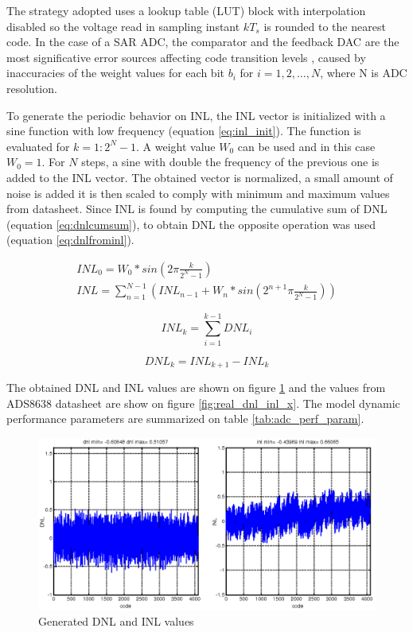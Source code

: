 \documentclass[conference]{IEEEtran}
\begin{document}
The strategy adopted uses a lookup table (LUT) block with interpolation disabled so the voltage read in sampling instant $kT_s$ is rounded to the nearest code. In the case of a SAR ADC, the comparator and the feedback DAC are the most significative error sources affecting code transition levels \cite{michaeli_unif}, caused by inaccuracies of the weight values for each bit $b_i$ for $i = 1, 2, \dots, N$, where N is ADC resolution. 

To generate the periodic behavior on INL, the INL vector is initialized with a sine function with low frequency (equation \ref{eq:inl_init}). The function is evaluated for $k = 1:2^N-1$. A weight value $W_0$ can be used and in this case $W_0 = 1$. For $N$ steps, a sine with double the frequency of the previous one is added to the INL vector. The obtained vector is normalized, a small amount of noise is added it is then scaled to comply with minimum and maximum values from datasheet. Since INL is found by computing the cumulative sum of DNL (equation \ref{eq:dnlcumsum}), to obtain DNL the opposite operation was used (equation \ref{eq:dnlfrominl}).

\begin{equation}
\begin{gathered}
INL_0 = W_0 * sin \left(2 \pi \frac{k}{2^N-1}\right) \\ 
INL = \sum_{n=1}^{N-1} \left(INL_{n-1} + W_n * sin\left(2^{n+1} \pi \frac{k}{2^N-1}\right)\right)
\end{gathered}
\label{eq:inl_init}
\end{equation}

\begin{equation}
INL_k = \sum_{i=1}^{k-1} DNL_i
\label{eq:dnlcumsum}
\end{equation}

\begin{equation}
DNL_k = INL_{k+1} - INL_k
\label{eq:dnlfrominl}
\end{equation}

The obtained DNL and INL values are shown on figure \ref{fig:gen_dnl_inl_x} and the values from ADS8638 datasheet are show on figure \ref{fig:real_dnl_inl_x}. The model dynamic performance parameters are summarized on table \ref{tab:adc_perf_param}.

\begin{figure}[h!]
\centering
\includegraphics[scale=0.28]{pics/models/dnl_inl_2.png}
\caption{Generated DNL and INL values}
\label{fig:gen_dnl_inl_x}
\end{figure}
\end{document}
